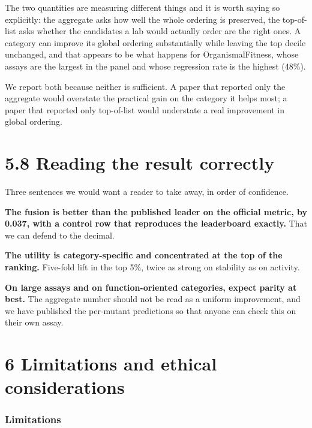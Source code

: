 \documentclass[sigconf,review,nonacm]{acmart}
\begin{document}
The two quantities are measuring different things and it is worth saying so explicitly: the aggregate
asks how well the whole ordering is preserved, the top-of-list asks whether the candidates a lab would
actually order are the right ones. A category can improve its global ordering substantially while
leaving the top decile unchanged, and that appears to be what happens for OrganismalFitness, whose
assays are the largest in the panel and whose regression rate is the highest (48\%).

We report both because neither is sufficient. A paper that reported only the aggregate would
overstate the practical gain on the category it helps most; a paper that reported only top-of-list would
understate a real improvement in global ordering.

\hypertarget{reading-the-result-correctly}{%
\section{5.8 Reading the result correctly}\label{reading-the-result-correctly}}

Three sentences we would want a reader to take away, in order of confidence.

\textbf{The fusion is better than the published leader on the official metric, by 0.037, with a control row
that reproduces the leaderboard exactly.} That we can defend to the decimal.

\textbf{The utility is category-specific and concentrated at the top of the ranking.} Five-fold lift in the
top 5\%, twice as strong on stability as on activity.

\textbf{On large assays and on function-oriented categories, expect parity at best.} The aggregate number
should not be read as a uniform improvement, and we have published the per-mutant predictions so that
anyone can check this on their own assay.

\hypertarget{limitations-and-ethical-considerations}{%
\section{6 Limitations and ethical considerations}\label{limitations-and-ethical-considerations}}

\hypertarget{limitations}{%
\subsubsection{Limitations}\label{limitations}}
\end{document}
